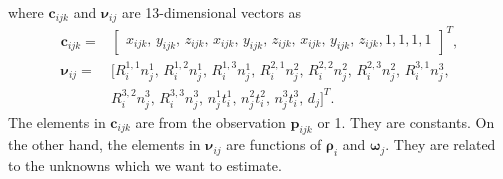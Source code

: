 \documentclass{vgtc}                          %
\begin{document}
where $\mathbf{c}_{ijk}$ and $\bm{\nu}_{ij}$ are 13-dimensional vectors as
\begin{equation} \label{equ_delta_definition}
	\begin{split}
		\mathbf{c}_{ijk}  =  & \begin{bmatrix}
			x_{ijk}, \, y_{ijk} ,\, z_{ijk}, \, x_{ijk}, \, y_{ijk} ,\, z_{ijk}, \, x_{ijk}, \, y_{ijk} ,\, z_{ijk}, 1, 1, 1, 1
		\end{bmatrix}^{T}, \\
		\bm{\nu}_{ij}  = &
			[R_{i}^{1,1}n_j^1, \,  R_{i}^{1,2}n_j^1, \, R_{i}^{1,3}n_j^1, \, R_{i}^{2,1}n_j^2, \,  R_{i}^{2,2}n_j^2, \, R_{i}^{2,3}n_j^2, \, R_{i}^{3,1}n_j^3,  \\
			&  R_{i}^{3,2}n_j^3, \, R_{i}^{3,3}n_j^3, \, n_{j}^{1}t_{i}^{1}, \, n_{j}^{2}t_{i}^{2}, \, n_{j}^{3}t_{i}^{3}, \, d_j ]^{T}.
	\end{split}
\end{equation}
The elements in $\mathbf{c}_{ijk}$ are from the observation $\mathbf{p}_{ijk}$ or 1. They are constants. On the other hand,  the elements in $\bm{\nu}_{ij}$ are functions of $\bm{\rho}_i$ and $\bm{\omega}_j$. They are related to the unknowns which we want to estimate. 
\end{document}
